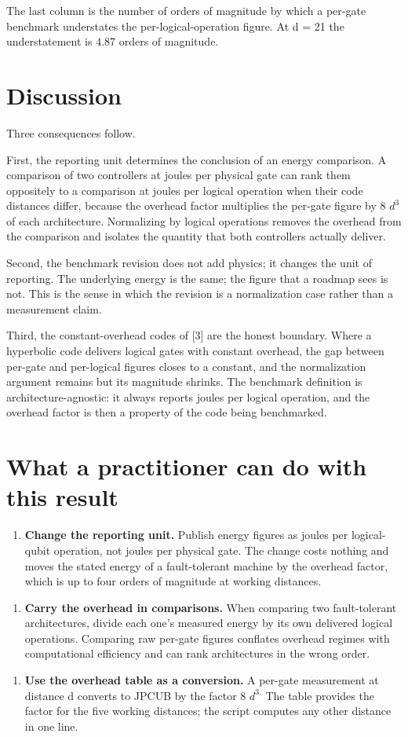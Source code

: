 \documentclass[11pt]{article}
\begin{document}
The last column is the number of orders of magnitude by which a per-gate benchmark understates the per-logical-operation figure. At d = 21 the understatement is 4.87 orders of magnitude.

\section{Discussion}
Three consequences follow.

First, the reporting unit determines the conclusion of an energy comparison. A comparison of two controllers at joules per physical gate can rank them oppositely to a comparison at joules per logical operation when their code distances differ, because the overhead factor multiplies the per-gate figure by 8 $d^{3}$ of each architecture. Normalizing by logical operations removes the overhead from the comparison and isolates the quantity that both controllers actually deliver.

Second, the benchmark revision does not add physics; it changes the unit of reporting. The underlying energy is the same; the figure that a roadmap sees is not. This is the sense in which the revision is a normalization case rather than a measurement claim.

Third, the constant-overhead codes of [3] are the honest boundary. Where a hyperbolic code delivers logical gates with constant overhead, the gap between per-gate and per-logical figures closes to a constant, and the normalization argument remains but its magnitude shrinks. The benchmark definition is architecture-agnostic: it always reports joules per logical operation, and the overhead factor is then a property of the code being benchmarked.

\section{What a practitioner can do with this result}
\begin{enumerate}
  \item \textbf{Change the reporting unit.} Publish energy figures as joules per logical-qubit operation, not joules per physical gate. The change costs nothing and moves the stated energy of a fault-tolerant machine by the overhead factor, which is up to four orders of magnitude at working distances.
\end{enumerate}
\begin{enumerate}
  \item \textbf{Carry the overhead in comparisons.} When comparing two fault-tolerant architectures, divide each one's measured energy by its own delivered logical operations. Comparing raw per-gate figures conflates overhead regimes with computational efficiency and can rank architectures in the wrong order.
\end{enumerate}
\begin{enumerate}
  \item \textbf{Use the overhead table as a conversion.} A per-gate measurement at distance d converts to JPCUB by the factor 8 $d^{3.}$ The table provides the factor for the five working distances; the script computes any other distance in one line.
\end{enumerate}
\end{document}
